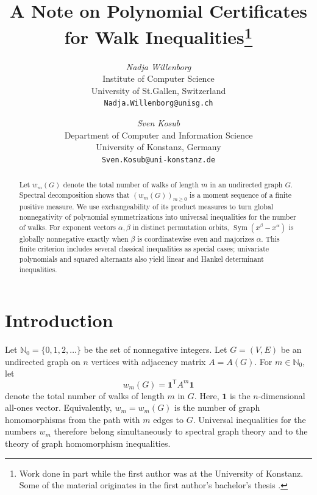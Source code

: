 \documentclass[11pt]{article}
\title{A Note on Polynomial Certificates for Walk Inequalities\footnote{Work done in part while the first author was at the University of Konstanz. Some of the material originates in the first author’s bachelor’s thesis \cite{willenborg-2016}.}}
\author{{\em Nadja Willenborg}\\
Institute of Computer Science \\
University of St.Gallen, Switzerland\\
{\tt Nadja.Willenborg@unisg.ch}
\and
{\em Sven Kosub} \\
Department of Computer and Information Science \\
University of Konstanz, Germany\\
{\tt Sven.Kosub@uni-konstanz.de}
}
\date{\empty}
\newcommand{\Nat}{\mathbb{N}}
\newcommand{\one}{\mathbf{1}}
\theoremstyle{remark}
\begin{document}
\maketitle


\begin{abstract}
Let \(w_m(G)\) denote the total number of walks of length \(m\) in an undirected graph \(G\). Spectral decomposition shows that  \((w_m(G))_{m\geq0}\) is a moment sequence of a finite positive measure. We use exchangeability of its product measures to turn global nonnegativity of polynomial symmetrizations into universal inequalities for the number of walks. For exponent vectors \(\alpha,\beta\) in distinct permutation orbits, \(\operatorname{Sym}(x^\beta-x^\alpha)\) is globally nonnegative exactly when \(\beta\) is coordinatewise even and majorizes \(\alpha\). 
This finite criterion includes several classical inequalities as special cases; univariate polynomials and squared alternants also yield linear and Hankel determinant inequalities.
\end{abstract}



\section{Introduction}

Let $\Nat_0=\{0,1,2,\dots\}$ be the set of nonnegative integers.
Let $G=(V,E)$ be an undirected graph on $n$ vertices with adjacency matrix $A=A(G)$.  For $m\in\Nat_0$, let
\[
  w_m(G)= \one^{\mathsf T}A^m\one 
\]
denote the total number of walks of length $m$ in $G$. Here, $\one$ is the $n$-dimensional all-ones vector. Equivalently, $w_m=w_m(G)$ is the number of graph homomorphisms from the path with $m$ edges to $G$.
Universal inequalities for the numbers $w_m$ therefore belong simultaneously to spectral graph theory and to the theory of graph homomorphism inequalities.
\end{document}

